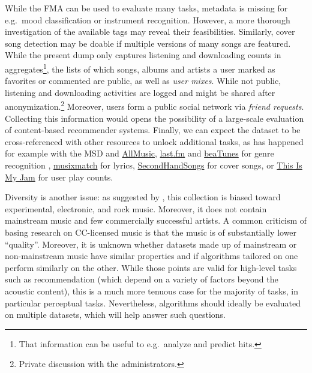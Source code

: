 \documentclass{article}
\newcommand{\todo}[1]{{\color{red} #1}}
\begin{document}
While the FMA can be used to evaluate many tasks, metadata is missing for e.g.\ mood classification or instrument recognition. However, a more thorough investigation of the available tags may reveal their feasibilities. Similarly, cover song detection may be doable if multiple versions of many songs are featured.
While the present dump only captures listening and downloading counts in aggregates\footnote{That information can be useful to e.g.\ analyze and predict hits.}, the lists of which songs, albums and artists a user marked as favorites or commented are public, as well as \textit{user mixes}. While not public, listening and downloading activities are logged and might be shared after anonymization.\footnote{Private discussion with the administrators.} Moreover, users form a public social network via \textit{friend requests}.
Collecting this information would opens the possibility of a large-scale evaluation of content-based recommender systems.
Finally, we can expect the dataset to be cross-referenced with other resources to unlock additional tasks, as has happened for example with the MSD and \href{http://www.allmusic.com}{AllMusic}, \href{https://www.last.fm}{last.fm} and \href{https://beatunes.com}{beaTunes} for genre recognition \cite{msd_features, msd_genres}, \href{https://musixmatch.com}{musixmatch} for lyrics, \href{https://secondhandsongs.com}{SecondHandSongs} for cover songs, or \href{https://www.thisismyjam.com}{This Is My Jam} for user play counts.

Diversity is another issue: as suggested by , this collection is biased toward experimental, electronic, and rock music. Moreover, it does not contain mainstream music and few commercially successful artists.
A common criticism of basing research on CC-licensed music is that the music is of substantially lower ``quality''. Moreover, it is unknown whether datasets made up of mainstream or non-mainstream music have similar properties and if algorithms tailored on one perform similarly on the other. While those points are valid for high-level tasks such as recommendation (which depend on a variety of factors beyond the acoustic content), this is a much more tenuous case for the majority of tasks, in particular perceptual tasks.
Nevertheless, algorithms should ideally be evaluated on multiple datasets, which will help answer such questions.
\end{document}
